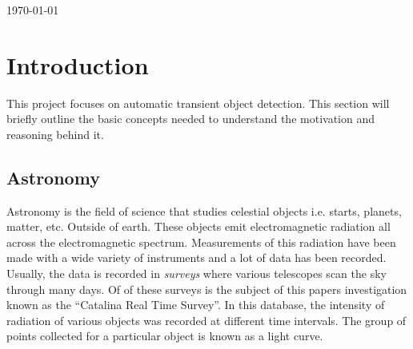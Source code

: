\begin{titlepage}


{\large \today}\\[2cm] %


\tableofcontents
 

\vfill %

\end{titlepage}


\section{Introduction}

This project focuses on automatic transient object detection. This section will briefly outline the basic concepts needed to understand the motivation and reasoning behind it. 

\subsection{Astronomy}

Astronomy is the field of science that studies celestial objects i.e. starts, planets, matter, etc. Outside of earth. These objects emit electromagnetic radiation all across the electromagnetic spectrum. Measurements of this radiation have been made with a  wide variety of instruments and a lot of data has been recorded. \\

Usually, the data is recorded in \textit{surveys} where various telescopes scan the sky through many days. Of of these surveys is the subject of this papers investigation known as the ``Catalina Real Time Survey''\cite{catalina}. In this database, the intensity of radiation of various objects was recorded at different time intervals. The group of points collected for a particular object is known as a light curve.\\


